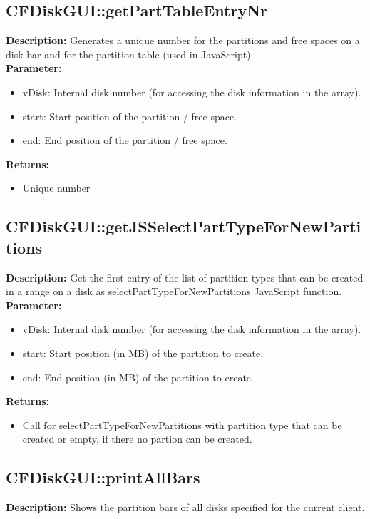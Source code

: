 \subsection{CFDiskGUI::getPartTableEntryNr}
\textbf{Description:} Generates a unique number for the partitions and free spaces on a disk bar and for the partition table (used in JavaScript).\\
\textbf{Parameter:}
\begin{itemize}
\item vDisk: Internal disk number (for accessing the disk information in the array).
\item start: Start position of the partition / free space.
\item end: End position of the partition / free space.
\end{itemize}
\textbf{Returns:}
\begin{itemize}
\item Unique number
\end{itemize}

\subsection{CFDiskGUI::getJSSelectPartTypeForNewPartitions}
\textbf{Description:} Get the first entry of the list of partition types that can be created in a range on a disk as selectPartTypeForNewPartitions JavaScript function.\\
\textbf{Parameter:}
\begin{itemize}
\item vDisk: Internal disk number (for accessing the disk information in the array).
\item start: Start position (in MB) of the partition to create.
\item end: End position (in MB) of the partition to create.
\end{itemize}
\textbf{Returns:}
\begin{itemize}
\item Call for selectPartTypeForNewPartitions with partition type that can be created or empty, if there no partion can be created.
\end{itemize}

\subsection{CFDiskGUI::printAllBars}
\textbf{Description:} Shows the partition bars of all disks specified for the current client.\\

